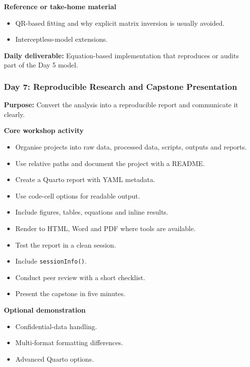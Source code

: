 \documentclass[11pt]{article}
\providecommand{\tightlist}{%
  \setlength{\itemsep}{0pt}\setlength{\parskip}{0pt}}
\begin{document}
\textbf{Reference or take-home material}

\begin{itemize}
\tightlist
\item
  QR-based fitting and why explicit matrix inversion is usually avoided.
\item
  Interceptless-model extensions.
\end{itemize}

\textbf{Daily deliverable:} Equation-based implementation that
reproduces or audits part of the Day 5 model.

\hypertarget{day-7-reproducible-research-and-capstone-presentation}{%
\subsubsection{Day 7: Reproducible Research and Capstone
Presentation}\label{day-7-reproducible-research-and-capstone-presentation}}

\textbf{Purpose:} Convert the analysis into a reproducible report and
communicate it clearly.

\textbf{Core workshop activity}

\begin{itemize}
\tightlist
\item
  Organise projects into raw data, processed data, scripts, outputs and
  reports.
\item
  Use relative paths and document the project with a README.
\item
  Create a Quarto report with YAML metadata.
\item
  Use code-cell options for readable output.
\item
  Include figures, tables, equations and inline results.
\item
  Render to HTML, Word and PDF where tools are available.
\item
  Test the report in a clean session.
\item
  Include \texttt{sessionInfo()}.
\item
  Conduct peer review with a short checklist.
\item
  Present the capstone in five minutes.
\end{itemize}

\textbf{Optional demonstration}

\begin{itemize}
\tightlist
\item
  Confidential-data handling.
\item
  Multi-format formatting differences.
\item
  Advanced Quarto options.
\end{itemize}
\end{document}
